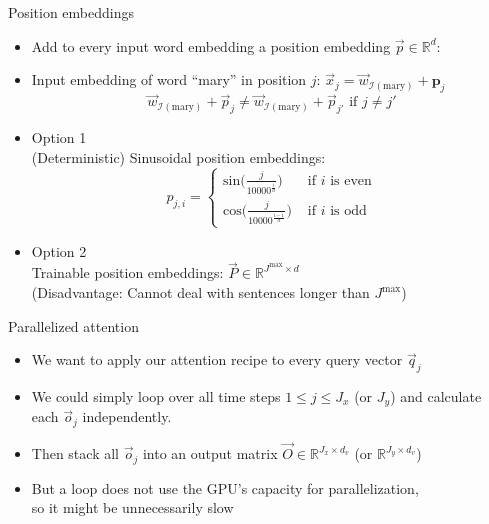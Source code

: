 \begin{vbframe}{Position embeddings}

\vfill

\begin{itemize}
\item Add to every input word embedding a position embedding $\vec {p} \in \mathbb{R}^d$:
\item Input embedding of word ``mary'' in position $j$: $\vec {x}_j = \vec {w}_{\mathcal{I}(\text{mary})} + \mathbf{p}_j$
$$\vec {w}_{\mathcal{I}(\text{mary})} + \vec {p}_j \neq \vec{w}_{\mathcal{I}(\text{mary})} + \vec {p}_{j'} \text{ if } j \neq j'$$
\item Option 1 \\ 
(Deterministic) Sinusoidal position embeddings: 
$$p_{j,i} = \begin{cases} \mathrm{sin}\big(\frac{j}{10000^\frac{i}{d}}\big)  & \text{ if } i \text{ is even} \\ \mathrm{cos}\big(\frac{j}{10000^\frac{i-1}{d}}\big) & \text{ if } i \text{ is odd}  \end{cases}$$
\item Option 2 \\
Trainable position embeddings: $\vec {P} \in \mathbb{R}^{J^\mathrm{max} \times d}$\\
(Disadvantage: Cannot deal with sentences longer than $J^\mathrm{max}$)
\end{itemize}

\vfill

\end{vbframe}


\begin{vbframe}{Parallelized attention}

\vfill

\begin{itemize}
\item We want to apply our attention recipe to every query vector $\vec q_j$
\item We could simply loop over all time steps $1 \leq j \leq J_x$ (or $J_y$) and calculate each $\vec o_j$ independently.
\item Then stack all $\vec o_j$ into an output matrix $\vec O \in \mathbb{R}^{J_x \times d_v}$ (or $\mathbb{R}^{J_y \times d_v}$)
\item But a loop does not use the GPU's capacity for parallelization,\\ so it might be unnecessarily slow
\end{itemize}

\vfill

\end{vbframe}

